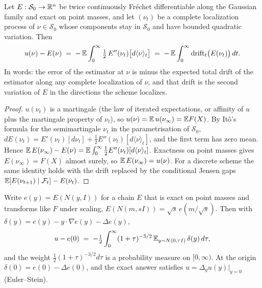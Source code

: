 \begin{theorem}\label{thm:defect}
Let $E:\mathcal S_0\to\mathbb R^n$ be twice continuously Fr\'echet differentiable along the Gaussian family and exact on point
masses, and let $(\nu_t)$ be a complete localization process of $\nu\in\mathcal S_0$ whose components stay in
$\mathcal S_0$ and have bounded quadratic variation. Then
\begin{equation}\label{eq:defect-path}
u(\nu)-E(\nu)\;=\;-\,\mathbb E\int_0^\infty \tfrac12\,E''(\nu_t)\big[d\langle\nu\rangle_t\big]
\;=\;-\,\mathbb E\int_0^\infty\mathrm{drift}_t\big(E(\nu_t)\big)\,dt .
\end{equation}
In words: the error of the estimator at $\nu$ is minus the expected total drift of the estimator along any complete
localization of $\nu$, and that drift is the second variation of $E$ in the directions the scheme localizes.
\end{theorem}

\begin{proof}
$u(\nu_t)$ is a martingale (the law of iterated expectations, or affinity of $u$ plus the martingale property of
$\nu_t$), so $u(\nu)=\mathbb E\,u(\nu_\infty)=\mathbb E F(X)$. By It\^o's formula for the semimartingale $\nu_t$ in the parametrisation
of $\mathcal S_0$, $dE(\nu_t)=E'(\nu_t)[d\nu_t]+\tfrac12E''(\nu_t)[d\langle\nu\rangle_t]$, and the first term has zero
mean. Hence $\mathbb E\,E(\nu_\infty)-E(\nu)=\mathbb E\int_0^\infty\tfrac12E''(\nu_t)[d\langle\nu\rangle_t]$. Exactness on point
masses gives $E(\nu_\infty)=F(X)$ almost surely, so $\mathbb E\,E(\nu_\infty)=u(\nu)$. For a discrete scheme the same identity
holds with the drift replaced by the conditional Jensen gaps $\mathbb E[E(\nu_{t+1})\mid\mathcal F_t]-E(\nu_t)$.
\end{proof}

\begin{corollary}\label{cor:eldan}
Write $e(y)=E(N(y,I))$ for a chain $E$ that is exact on point masses and transforms like $F$ under scaling,
$E(N(m,sI))=\sqrt s\,e(m/\sqrt s)$. Then with $\delta(y)=e(y)-y\cdot\nabla e(y)-\Delta e(y)$,
\begin{equation}\label{eq:eldan}
u-e(0)\;=\;-\tfrac12\int_0^\infty(1+\tau)^{-3/2}\,\mathbb E_{y\sim N(0,\tau I)}\,\delta(y)\,d\tau ,
\end{equation}
and the weight $\tfrac12(1+\tau)^{-3/2}d\tau$ is a probability measure on $[0,\infty)$. At the origin $\delta(0)=e(0)-\Delta
e(0)$, and the exact answer satisfies $u=\Delta_y u(y)|_{y=0}$ (Euler--Stein).
\end{corollary}

